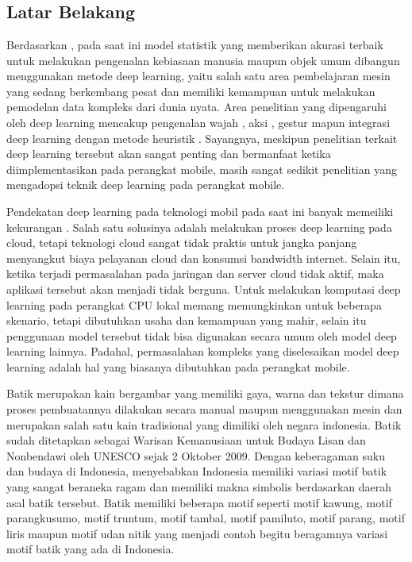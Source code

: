 \chapter{\babSatu}

\section{Latar Belakang}
Berdasarkan \cite{deepx}, pada saat ini model statistik yang memberikan akurasi terbaik untuk melakukan pengenalan kebiasaan manusia maupun objek umum dibangun menggunakan metode deep learning, yaitu salah satu area pembelajaran mesin yang sedang berkembang pesat dan  memiliki kemampuan untuk melakukan pemodelan data kompleks dari dunia nyata. Area penelitian yang dipengaruhi oleh deep learning mencakup pengenalan wajah \cite{face_occlusion}, aksi \cite{har_mocap_fnn}, gestur \cite{hand_gesture} mapun integrasi deep learning dengan metode heuristik \cite{meta_cnn}. Sayangnya, meskipun penelitian terkait deep learning tersebut akan sangat penting dan bermanfaat ketika diimplementasikan pada perangkat mobile, masih sangat sedikit penelitian yang mengadopsi teknik deep learning pada perangkat mobile.

Pendekatan deep learning pada teknologi mobil pada saat ini banyak memeiliki kekurangan \cite{deepx}. Salah satu solusinya adalah melakukan proses deep learning pada cloud, tetapi teknologi cloud sangat tidak praktis untuk jangka panjang menyangkut biaya pelayanan cloud dan konsumsi bandwidth internet. Selain itu, ketika terjadi permasalahan pada jaringan dan server cloud tidak aktif, maka aplikasi tersebut akan menjadi tidak berguna. Untuk melakukan komputasi deep learning pada perangkat CPU lokal memang memungkinkan untuk beberapa skenario, tetapi dibutuhkan usaha dan kemampuan yang mahir, selain itu penggunaan model tersebut tidak bisa digunakan secara umum oleh model deep learning lainnya. Padahal, permasalahan kompleks yang diselesaikan model deep learning adalah hal yang biasanya dibutuhkan pada perangkat mobile.

Batik merupakan kain bergambar yang memiliki gaya, warna dan tekstur dimana proses pembuatannya dilakukan secara manual maupun menggunakan mesin dan merupakan salah satu kain tradisional yang dimiliki oleh negara indonesia. Batik sudah ditetapkan sebagai Warisan Kemanusiaan untuk Budaya Lisan dan Nonbendawi oleh UNESCO sejak 2 Oktober 2009. Dengan keberagaman suku dan budaya di Indonesia, menyebabkan Indonesia memiliki variasi motif batik yang sangat beraneka ragam dan memiliki makna simbolis berdasarkan daerah asal batik tersebut. Batik memiliki beberapa motif seperti motif kawung, motif parangkusumo, motif truntum, motif tambal, motif pamiluto, motif parang, motif liris maupun motif udan nitik yang menjadi contoh begitu beragamnya variasi motif batik yang ada di Indonesia.


